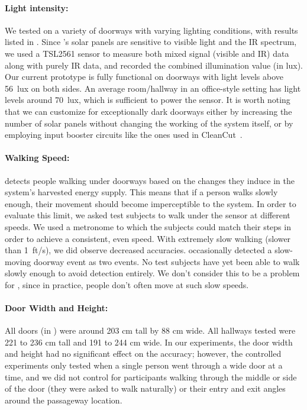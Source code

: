 \paragraph{Light intensity:}
We tested \sysname on a variety of doorways with varying lighting conditions, with results listed in . 
Since \sysname's solar panels are sensitive to visible light and the IR spectrum, we used a TSL2561 sensor to measure both mixed signal (visible and IR) data along with purely IR data, and recorded the combined illumination value (in lux).
Our current prototype is fully functional on doorways with light levels above 56~lux on both sides.
An average room/hallway in an office-style setting has light levels around 70~lux, which is sufficient to power the \sysname sensor.
It is worth noting that we can customize \sysname for exceptionally dark doorways either by increasing the number of solar panels without changing the working of the system itself, or by employing input booster circuits like the ones used in CleanCut~\cite{colin2018cleancut}.

\paragraph{Walking Speed:}
\sysname detects people walking under doorways based on the changes they induce in the system's harvested energy supply.
This means that if a person walks slowly enough, their movement should become imperceptible to the system.
In order to evaluate this limit, we asked test subjects to walk under the sensor at different speeds.
We used a metronome to which the subjects could match their steps in order to achieve a consistent, even speed.
With extremely slow walking (slower than 1~ft/s), we did observe decreased accuracies.
\sysname occasionally detected a slow-moving doorway event as two events.
No test subjects have yet been able to walk slowly enough to avoid detection entirely.
We don't consider this to be a problem for \sysname, since in practice, people don't often move at such slow speeds.

\paragraph{Door Width and Height:}
All doors (in ) were around 203 cm tall by 88 cm wide.  All hallways tested were 221 to 236 cm tall and 191 to 244 cm wide.
In our experiments, the door width and height had no significant effect on the accuracy; however, the controlled experiments only tested when a single person went through a wide door at a time, and we did not control for participants walking through the middle or side of the door (they were asked to walk naturally) or their entry and exit angles around the passageway location.


